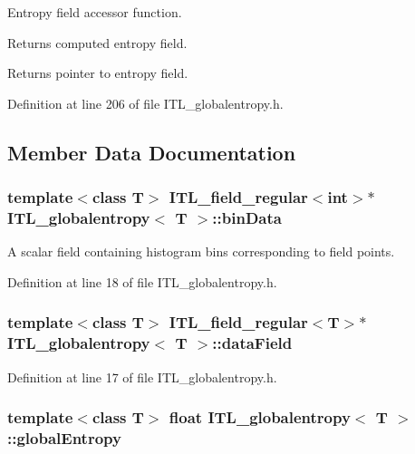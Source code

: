 Entropy field accessor function. 

Returns computed entropy field. \begin{DoxyReturn}{Returns}
pointer to entropy field. 
\end{DoxyReturn}


Definition at line 206 of file ITL\_\-globalentropy.h.



\subsection{Member Data Documentation}
\hypertarget{classITL__globalentropy_ac546157f722e8b579c020180a0473ea0}{
\subsubsection[{binData}]{\setlength{\rightskip}{0pt plus 5cm}template$<$class T$>$ {\bf ITL\_\-field\_\-regular}$<$int$>$$\ast$ {\bf ITL\_\-globalentropy}$<$ T $>$::{\bf binData}}}
\label{classITL__globalentropy_ac546157f722e8b579c020180a0473ea0}


A scalar field containing histogram bins corresponding to field points. 



Definition at line 18 of file ITL\_\-globalentropy.h.

\hypertarget{classITL__globalentropy_adc0074ac722c23f71868d43ed818e063}{
\subsubsection[{dataField}]{\setlength{\rightskip}{0pt plus 5cm}template$<$class T$>$ {\bf ITL\_\-field\_\-regular}$<$T$>$$\ast$ {\bf ITL\_\-globalentropy}$<$ T $>$::{\bf dataField}}}
\label{classITL__globalentropy_adc0074ac722c23f71868d43ed818e063}


Definition at line 17 of file ITL\_\-globalentropy.h.

\hypertarget{classITL__globalentropy_a462d47cb4eb2b6b7dae04113db7f301a}{
\subsubsection[{globalEntropy}]{\setlength{\rightskip}{0pt plus 5cm}template$<$class T$>$ float {\bf ITL\_\-globalentropy}$<$ T $>$::{\bf globalEntropy}}}
\label{classITL__globalentropy_a462d47cb4eb2b6b7dae04113db7f301a}


